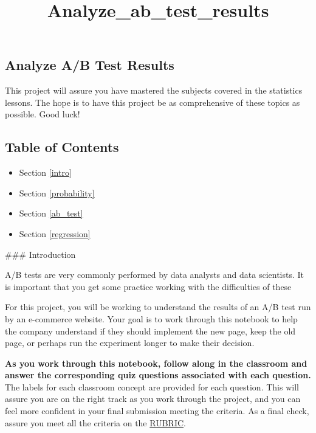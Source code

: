 \documentclass[11pt]{article}
\title{Analyze\_ab\_test\_results}
\providecommand{\tightlist}{%
      \setlength{\itemsep}{0pt}\setlength{\parskip}{0pt}}
\begin{document}
    
    
    \maketitle
    
    

    
    \subsection{Analyze A/B Test Results}\label{analyze-ab-test-results}

This project will assure you have mastered the subjects covered in the
statistics lessons. The hope is to have this project be as comprehensive
of these topics as possible. Good luck!

\subsection{Table of Contents}\label{table-of-contents}

\begin{itemize}
\tightlist
\item
  Section \ref{intro}
\item
  Section \ref{probability}
\item
  Section \ref{ab_test}
\item
  Section \ref{regression}
\end{itemize}

     \#\#\# Introduction

A/B tests are very commonly performed by data analysts and data
scientists. It is important that you get some practice working with the
difficulties of these

For this project, you will be working to understand the results of an
A/B test run by an e-commerce website. Your goal is to work through this
notebook to help the company understand if they should implement the new
page, keep the old page, or perhaps run the experiment longer to make
their decision.

\textbf{As you work through this notebook, follow along in the classroom
and answer the corresponding quiz questions associated with each
question.} The labels for each classroom concept are provided for each
question. This will assure you are on the right track as you work
through the project, and you can feel more confident in your final
submission meeting the criteria. As a final check, assure you meet all
the criteria on the
\href{https://review.udacity.com/\#!/projects/37e27304-ad47-4eb0-a1ab-8c12f60e43d0/rubric}{RUBRIC}.
\end{document}

